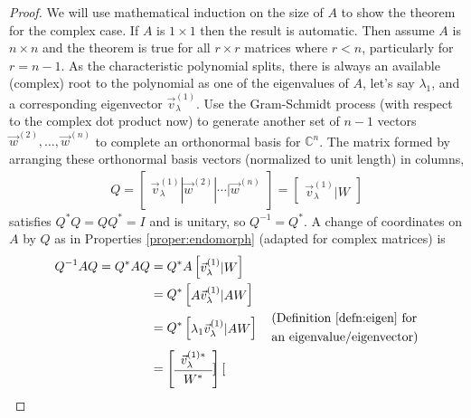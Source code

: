 \begin{proof}
We will use mathematical induction on the size of $A$ to show the theorem for the complex case. If $A$ is $1 \times 1$ then the result is automatic. Then assume $A$ is $n \times n$ and the theorem is true for all $r \times r$ matrices where $r < n$, particularly for $r = n-1$. As the characteristic polynomial splits, there is always an available (complex) root to the polynomial as one of the eigenvalues of $A$, let's say $\lambda_1$, and a corresponding eigenvector $\vec{v}_\lambda^{(1)}$. Use the Gram-Schmidt process (with respect to the complex dot product now) to generate another set of $n-1$ vectors $\vec{w}^{(2)}, \ldots, \vec{w}^{(n)}$ to complete an orthonormal basis for $\mathbb{C}^n$. The matrix formed by arranging these orthonormal basis vectors (normalized to unit length) in columns,
\begin{align*}
Q = \begin{bmatrix}
\vec{v}_\lambda^{(1)} | \vec{w}^{(2)} | \cdots | \vec{w}^{(n)}
\end{bmatrix} =
\begin{bmatrix}
\vec{v}_\lambda^{(1)} | W
\end{bmatrix}
\end{align*}
satisfies $Q^*Q = QQ^* = I$ and is unitary, so $Q^{-1} = Q^*$. A change of coordinates on $A$ by $Q$ as in Properties \ref{proper:endomorph} (adapted for complex matrices) is
\begin{align}
Q^{-1}AQ = Q^* AQ &= Q^*A\begin{bmatrix}
\vec{v}_\lambda^{(1)} | W
\end{bmatrix} \nonumber \\
&= Q^*\begin{bmatrix}
A\vec{v}_\lambda^{(1)} | AW
\end{bmatrix} \nonumber \\
&= Q^*\begin{bmatrix}
\lambda_1\vec{v}_\lambda^{(1)} | AW
\end{bmatrix} \quad \begin{aligned}
&\text{(Definition \ref{defn:eigen} for} \\
&\text{an eigenvalue/eigenvector)}
\end{aligned} \nonumber \\
&= 
\left[\begin{array}{c}
\vec{v}_\lambda^{(1)*} \Bstrut \\
\hline
W^* \Tstrut
\end{array}\right]
\begin{bmatrix}

\end{bmatrix}
\end{align}
\end{proof}
